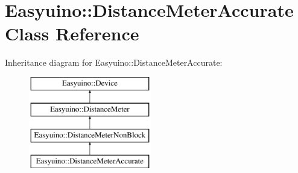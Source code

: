 \hypertarget{class_easyuino_1_1_distance_meter_accurate}{}\section{Easyuino\+:\+:Distance\+Meter\+Accurate Class Reference}
\label{class_easyuino_1_1_distance_meter_accurate}
Inheritance diagram for Easyuino\+:\+:Distance\+Meter\+Accurate\+:\begin{figure}[H]
\begin{center}
\leavevmode
\includegraphics[height=4.000000cm]{class_easyuino_1_1_distance_meter_accurate}
\end{center}
\end{figure}
